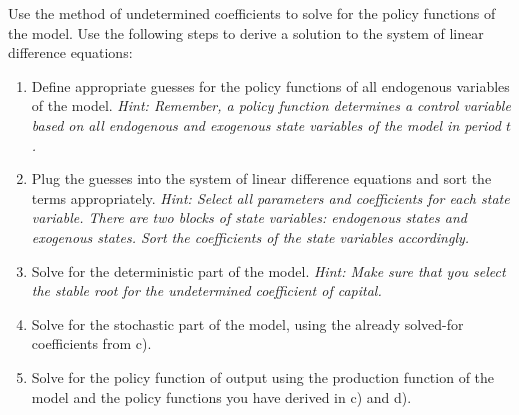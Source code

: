 \documentclass[a4paper, 12pt]{article}
\begin{document}
\begin{Exercise}[title={ADDITIONAL: Method of Undetermined Coefficients},label=ex_2]%
	Use the method of undetermined coefficients to solve for the policy functions of the model. Use the following steps to derive a solution to the system of linear difference equations:%
	\begin{small}%
		\begin{enumerate}%
			\item[a) ] Define appropriate guesses for the policy functions of all endogenous variables of the model. \emph{Hint: Remember, a policy function determines a control variable based on all endogenous and exogenous state variables of the model in period $t$.}%
			\item[b) ] Plug the guesses into the system of linear difference equations and sort the terms appropriately. \emph{Hint: Select all parameters and coefficients for each state variable. There are two blocks of state variables: endogenous states and exogenous states. Sort the coefficients of the state variables accordingly.}%
			\item[c) ] Solve for the deterministic part of the model. \textit{Hint: Make sure that you select the stable root for the undetermined coefficient of capital.}%
			\item[d) ] Solve for the stochastic part of the model, using the already solved-for coefficients from c).%
			\item[e) ] Solve for the policy function of output using the production function of the model and the policy functions you have derived in c) and d).%
		\end{enumerate}%
	\end{small}%
\end{Exercise}%
\bigskip%
\end{document}
